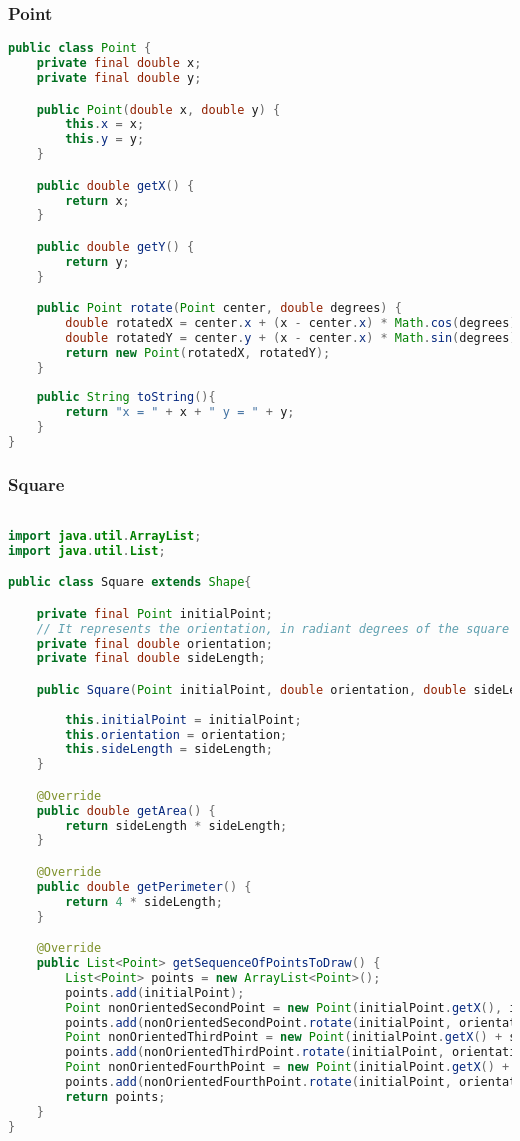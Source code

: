 \documentclass{article}
\begin{document}
\subsubsection{Point}
\begin{lstlisting}[language=Java,escapechar=|]
public class Point {
	private final double x;
	private final double y;

	public Point(double x, double y) {
		this.x = x;
		this.y = y;
	}

	public double getX() {
		return x;
	}

	public double getY() {
		return y;
	}

	public Point rotate(Point center, double degrees) {
		double rotatedX = center.x + (x - center.x) * Math.cos(degrees) - (y - center.y) * Math.sin(degrees);
		double rotatedY = center.y + (x - center.x) * Math.sin(degrees) + (y - center.y) * Math.cos(degrees);
		return new Point(rotatedX, rotatedY);
	}
	
	public String toString(){
		return "x = " + x + " y = " + y;
	}
}
\end{lstlisting}

\subsubsection{Square}
\begin{lstlisting}[language=Java,escapechar=|]

import java.util.ArrayList;
import java.util.List;

public class Square extends Shape{

	private final Point initialPoint;
	// It represents the orientation, in radiant degrees of the square
	private final double orientation;
	private final double sideLength;

	public Square(Point initialPoint, double orientation, double sideLength) {
	
		this.initialPoint = initialPoint;
		this.orientation = orientation;
		this.sideLength = sideLength;
	}

	@Override
	public double getArea() {
		return sideLength * sideLength;
	}

	@Override
	public double getPerimeter() {
		return 4 * sideLength;
	}

	@Override
	public List<Point> getSequenceOfPointsToDraw() {
		List<Point> points = new ArrayList<Point>();
		points.add(initialPoint);
		Point nonOrientedSecondPoint = new Point(initialPoint.getX(), initialPoint.getY() + sideLength);
		points.add(nonOrientedSecondPoint.rotate(initialPoint, orientation));
		Point nonOrientedThirdPoint = new Point(initialPoint.getX() + sideLength, initialPoint.getY() + sideLength);
		points.add(nonOrientedThirdPoint.rotate(initialPoint, orientation));
		Point nonOrientedFourthPoint = new Point(initialPoint.getX() + sideLength, initialPoint.getY());
		points.add(nonOrientedFourthPoint.rotate(initialPoint, orientation));
		return points;
	}
}
\end{lstlisting}
\end{document}
